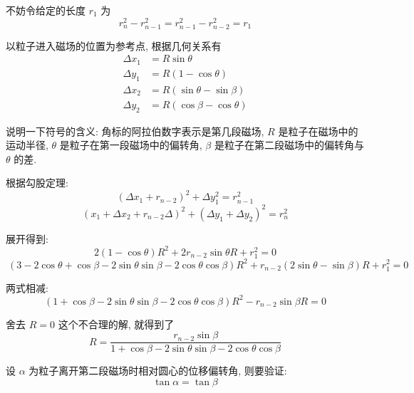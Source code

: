 \documentclass[12pt,a4paper]{article}
\begin{document}
	不妨令给定的长度 $r_1$ 为
	\begin{equation}
		r_n^2-r_{n-1}^2=r_{n-1}^2-r_{n-2}^2=r_1
	\end{equation}
	
	以粒子进入磁场的位置为参考点, 根据几何关系有
	\begin{align}
		\Delta x_1&=R\sin\theta
		\\
		\Delta y_1&=R\left( 1-\cos\theta\right)
		\\
		\Delta x_2&=R\left( \sin\theta-\sin\beta\right)  
		\\
		\Delta y_2&=R\left(\cos\beta-\cos\theta \right) 
	\end{align}
	
	说明一下符号的含义: 角标的阿拉伯数字表示是第几段磁场, $R$ 是粒子在磁场中的运动半径, $\theta$ 是粒子在第一段磁场中的偏转角, $\beta$ 是粒子在第二段磁场中的偏转角与 $\theta$ 的差.
	
	根据勾股定理:
	\begin{equation}
		\left( \Delta x_1+r_{n-2}\right)^2+\Delta y_1^2=r^2_{n-1} 
	\end{equation}
	\begin{equation}
		\left(  x_1+\Delta x_2+r_{n-2}\Delta\right)^2+\left( \Delta y_1+\Delta y_2\right)^2=r_n^2
	\end{equation}
	
	展开得到:
	\begin{equation}
		2\left(1-\cos\theta \right)R^2+2r_{n-2}\sin\theta R+r_1^2=0
	\end{equation}
	\begin{equation}
		\		\left( 3-2\cos\theta+\cos\beta-2\sin\theta\sin\beta-2\cos\theta\cos\beta\right)R^2+r_{n-2}\left(2\sin\theta -\sin\beta \right)R+r_1^2=0 
	\end{equation}
	
	两式相减:
	\begin{equation}
		\left( 1+\cos \beta -2\sin \theta \sin \beta -2\cos \theta \cos \beta \right) R^2-r_{n-2}\sin \beta R=0
	\end{equation}
	
	舍去 $R=0$ 这个不合理的解, 就得到了
	\begin{equation}
		R=\frac{r_{n-2}\sin \beta}{1+\cos \beta -2\sin \theta \sin \beta -2\cos \theta \cos \beta}
	\end{equation}
	
	设 $\alpha$ 为粒子离开第二段磁场时相对圆心的位移偏转角, 则要验证:
	\begin{equation}
		\tan\alpha=\tan\beta
	\end{equation}
	
\end{document}
